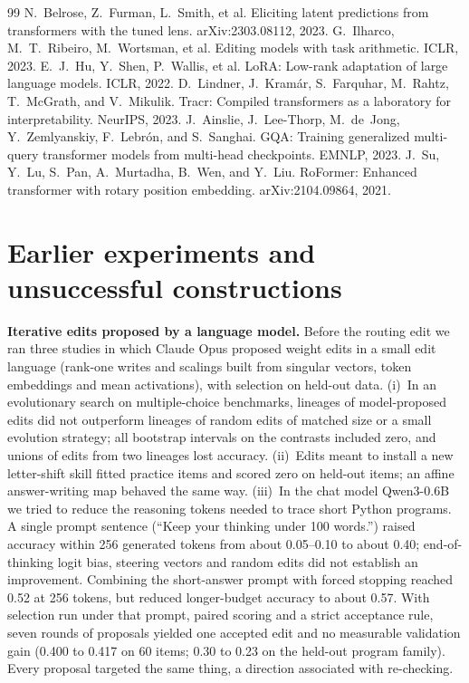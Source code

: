 \documentclass[11pt]{article}
\begin{document}
\begin{thebibliography}{99}
 N.~Belrose, Z.~Furman, L.~Smith, et al. Eliciting latent predictions from transformers with the tuned lens. arXiv:2303.08112, 2023.
 G.~Ilharco, M.~T.~Ribeiro, M.~Wortsman, et al. Editing models with task arithmetic. ICLR, 2023.
 E.~J.~Hu, Y.~Shen, P.~Wallis, et al. LoRA: Low-rank adaptation of large language models. ICLR, 2022.
 D.~Lindner, J.~Kram\'ar, S.~Farquhar, M.~Rahtz, T.~McGrath, and V.~Mikulik. Tracr: Compiled transformers as a laboratory for interpretability. NeurIPS, 2023.
 J.~Ainslie, J.~Lee-Thorp, M.~de~Jong, Y.~Zemlyanskiy, F.~Lebr\'on, and S.~Sanghai. GQA: Training generalized multi-query transformer models from multi-head checkpoints. EMNLP, 2023.
 J.~Su, Y.~Lu, S.~Pan, A.~Murtadha, B.~Wen, and Y.~Liu. RoFormer: Enhanced transformer with rotary position embedding. arXiv:2104.09864, 2021.
\end{thebibliography}

\appendix
\section{Earlier experiments and unsuccessful constructions}\label{sec:negative}

\textbf{Iterative edits proposed by a language model.} Before the routing edit we ran three studies in which Claude Opus proposed weight edits in a small edit language (rank-one writes and scalings built from singular vectors, token embeddings and mean activations), with selection on held-out data. (i)~In an evolutionary search on multiple-choice benchmarks, lineages of model-proposed edits did not outperform lineages of random edits of matched size or a small evolution strategy; all bootstrap intervals on the contrasts included zero, and unions of edits from two lineages lost accuracy. (ii)~Edits meant to install a new letter-shift skill fitted practice items and scored zero on held-out items; an affine answer-writing map behaved the same way. (iii)~In the chat model Qwen3-0.6B we tried to reduce the reasoning tokens needed to trace short Python programs. A single prompt sentence (``Keep your thinking under 100 words.'') raised accuracy within 256 generated tokens from about 0.05--0.10 to about 0.40; end-of-thinking logit bias, steering vectors and random edits did not establish an improvement. Combining the short-answer prompt with forced stopping reached 0.52 at 256 tokens, but reduced longer-budget accuracy to about 0.57. With selection run under that prompt, paired scoring and a strict acceptance rule, seven rounds of proposals yielded one accepted edit and no measurable validation gain (0.400 to 0.417 on 60 items; 0.30 to 0.23 on the held-out program family). Every proposal targeted the same thing, a direction associated with re-checking.
\end{document}
